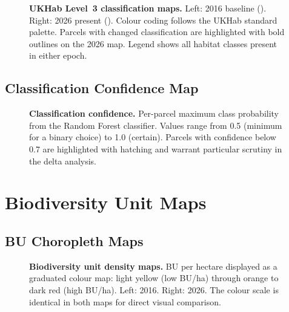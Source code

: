 \begin{figure}[H]
\centering
{}
\caption[Paired habitat classification maps 2016 and 2026.]{%
\textbf{UKHab Level~3 classification maps.} Left: 2016 baseline (\Tzero). Right: 2026 present (\Tone). Colour coding follows the UKHab standard palette. Parcels with changed classification are highlighted with bold outlines on the 2026 map. Legend shows all habitat classes present in either epoch.%
}
\label{fig:cat-classification-paired}
\end{figure}

\subsection{Classification Confidence Map}

\begin{figure}[H]
\centering
{}
\caption[Random Forest classification confidence.]{%
\textbf{Classification confidence.} Per-parcel maximum class probability from the Random Forest classifier. Values range from 0.5 (minimum for a binary choice) to 1.0 (certain). Parcels with confidence below 0.7 are highlighted with hatching and warrant particular scrutiny in the delta analysis.%
}
\label{fig:cat-confidence-map}
\end{figure}


\section{Biodiversity Unit Maps}

\subsection{BU Choropleth Maps}

\begin{figure}[H]
\centering
{}
\caption[Paired BU choropleth maps.]{%
\textbf{Biodiversity unit density maps.} BU per hectare displayed as a graduated colour map: light yellow (low BU/ha) through orange to dark red (high BU/ha). Left: 2016. Right: 2026. The colour scale is identical in both maps for direct visual comparison.%
}
\label{fig:cat-bu-choropleth}
\end{figure}

